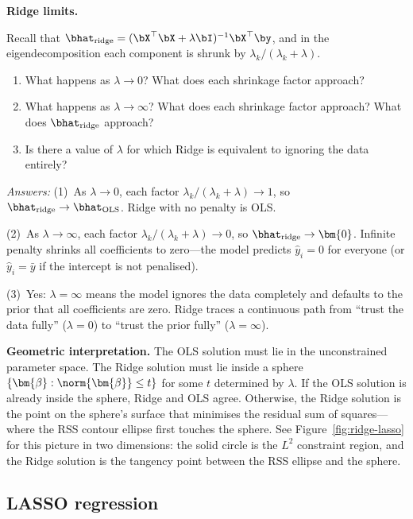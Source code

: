 \begin{stopandthink}
\textbf{Ridge limits.}

Recall that
$\bhat_{\text{ridge}} = (\bX^\top\bX + \lambda\bI)^{-1}\bX^\top\by$,
and in the eigendecomposition each component is shrunk by
$\lambda_k / (\lambda_k + \lambda)$.
\begin{enumerate}[nosep]
  \item What happens as $\lambda \to 0$?
        What does each shrinkage factor approach?
  \item What happens as $\lambda \to \infty$?
        What does each shrinkage factor approach?
        What does $\bhat_{\text{ridge}}$ approach?
  \item Is there a value of $\lambda$ for which Ridge is
        equivalent to ignoring the data entirely?
\end{enumerate}
\emph{Answers:}
(1)~As $\lambda \to 0$, each factor
$\lambda_k/(\lambda_k + \lambda) \to 1$,
so $\bhat_{\text{ridge}} \to \bhat_{\text{OLS}}$.
Ridge with no penalty is OLS\@.

(2)~As $\lambda \to \infty$, each factor
$\lambda_k/(\lambda_k + \lambda) \to 0$,
so $\bhat_{\text{ridge}} \to \bm{0}$.
Infinite penalty shrinks all coefficients to zero---the model predicts
$\hat{y}_i = 0$ for everyone (or $\hat{y}_i = \bar{y}$ if the intercept
is not penalised).

(3)~Yes: $\lambda = \infty$ means the model ignores the data
completely and defaults to the prior that all coefficients are zero.
Ridge traces a continuous path from ``trust the data fully''
($\lambda=0$) to ``trust the prior fully'' ($\lambda=\infty$).
\end{stopandthink}


\medskip
\noindent\textbf{Geometric interpretation.}
The OLS solution must lie in the unconstrained parameter space.
The Ridge solution must lie inside a sphere
$\{\bm{\beta}:\norm{\bm{\beta}}\le t\}$ for some $t$ determined
by $\lambda$.
If the OLS solution is already inside the sphere, Ridge and OLS agree.
Otherwise, the Ridge solution is the point on the sphere's surface
that minimises the residual sum of squares---where the RSS
contour ellipse first touches the sphere.
See Figure~\ref{fig:ridge-lasso} for this picture in two dimensions:
the solid circle is the $L^2$ constraint region, and the Ridge
solution is the tangency point between the RSS ellipse and the sphere.


\subsection{LASSO regression}


